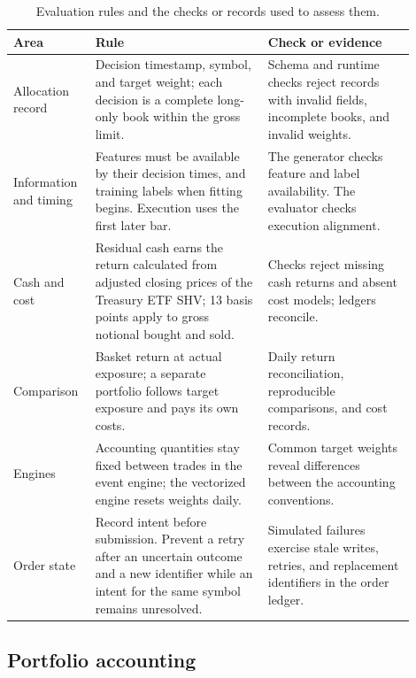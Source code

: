 \documentclass{article}
\begin{document}
\begin{table}[t]
  \caption{Evaluation rules and the checks or records used to assess them.}
  \label{tab:invariants}
  \centering
  \begin{tabular}{>{\raggedright\arraybackslash}p{0.16\linewidth}
                  >{\raggedright\arraybackslash}p{0.40\linewidth}
                  >{\raggedright\arraybackslash}p{0.34\linewidth}}
    \toprule
    Area & Rule & Check or evidence \\
    \midrule
    Allocation record & Decision timestamp, symbol, and target weight; each decision is a complete long-only book within the gross limit. & Schema and runtime checks reject records with invalid fields, incomplete books, and invalid weights. \\
    Information and timing & Features must be available by their decision times, and training labels when fitting begins. Execution uses the first later bar. & The generator checks feature and label availability. The evaluator checks execution alignment. \\
    Cash and cost & Residual cash earns the return calculated from adjusted closing prices of the Treasury ETF SHV; 13 basis points apply to gross notional bought and sold. & Checks reject missing cash returns and absent cost models; ledgers reconcile. \\
    Comparison & Basket return at actual exposure; a separate portfolio follows target exposure and pays its own costs. & Daily return reconciliation, reproducible comparisons, and cost records. \\
    Engines & Accounting quantities stay fixed between trades in the event engine; the vectorized engine resets weights daily. & Common target weights reveal differences between the accounting conventions. \\
    Order state & Record intent before submission. Prevent a retry after an uncertain outcome and a new identifier while an intent for the same symbol remains unresolved. & Simulated failures exercise stale writes, retries, and replacement identifiers in the order ledger. \\
    \bottomrule
  \end{tabular}
\end{table}

\subsection{Portfolio accounting}
\end{document}
